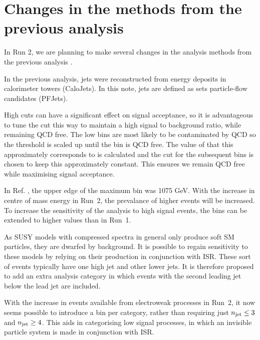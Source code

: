 \section{Changes in the methods from the previous analysis}
\label{sec:strategy}

In Run 2, we are planning to make several changes in the analysis
methods from the previous analysis \cite{CMS_AN_2013-366}.


In the previous analysis, jets were reconstructed from energy deposits
in calorimeter towers (CaloJets). In this note, jets are defined as sets
particle-flow candidates (PFJets).


High \alphat cuts can have a significant effect on signal acceptance, so
it is advantageous to tune the cut this way to maintain a high signal to
background ratio, while remaining QCD free. The low \HT bins are most
likely to be contaminated by QCD so the \alphat threshold is scaled up
until the bin is QCD free. The value of \mht that this approximately
corresponds to is calculated and the \alphat cut for the subsequent bins
is chosen to keep this \mht approximately constant. This ensures we
remain QCD free while maximising signal acceptance.

In Ref. \cite{CMS_AN_2013-366}, the upper edge of the maximum \HT bin
was 1075 GeV. With the increase in centre of mass energy in Run~2, the
prevalance of higher \HT events will be increased. To increase the
sensitivity of the analysis to high \HT signal events, the \HT bins can
be extended to higher values than in Run~1.

As SUSY models with compressed spectra in general only produce soft SM
particles, they are dwarfed by background. It is possible to regain
sensitivity to these models by relying on their production in
conjunction with ISR. These sort of events typically have one high \PT
jet and other lower \PT jets. It is therefore proposed to add an extra
analysis category in which events with the second leading jet below the
lead jet are included.

With the increase in events available from electroweak processes in
Run~2, it now seems possible to introduce a bin per \njet category,
rather than requiring just $n_{\text{jet}} \leq 3$ and $n_{\text{jet}} \geq 4$. This aids
in categorising low \njet signal processes, in which an invisible
particle system is made in conjunction with ISR.

